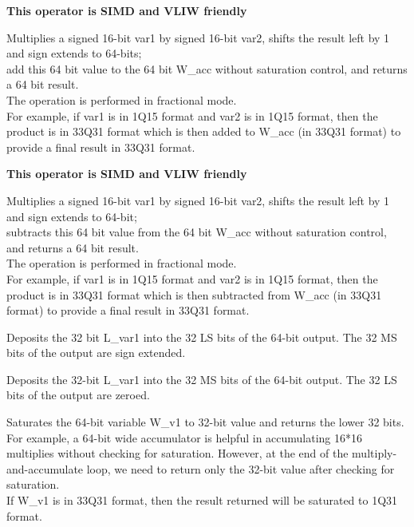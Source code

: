 
\textbf{ This operator is SIMD and VLIW friendly}

Multiplies a signed 16-bit var1 by signed 16-bit var2, shifts the result left by 1 and sign extends to 64-bits;\\
add this 64 bit value to the 64 bit W\_acc without saturation control, and returns a 64 bit result.\\
The operation is performed in fractional mode.\\
For example, if var1 is in 1Q15 format and var2 is in 1Q15 format, then the product is in 33Q31 format which is then added to W\_acc (in 33Q31 format) to provide a final result in 33Q31 format.


\textbf{ This operator is SIMD and VLIW friendly}

Multiplies a signed 16-bit var1 by signed 16-bit var2, shifts the result left by 1 and sign extends to 64-bit;\\
subtracts this 64 bit value from the 64 bit W\_acc without saturation control, and returns a 64 bit result.\\
The operation is performed in fractional mode.\\
For example, if var1 is in 1Q15 format and var2 is in 1Q15 format, then the product is in 33Q31 format which is then subtracted from W\_acc (in 33Q31 format) to provide a final result in 33Q31 format.


Deposits the 32 bit L\_var1 into the 32 LS bits of the 64-bit output. The 32 MS bits of the output are sign extended.


Deposits the 32-bit L\_var1 into the 32 MS bits of the 64-bit output. The 32 LS bits of the output are zeroed.


Saturates the 64-bit variable W\_v1 to 32-bit value and returns the lower 32 bits.\\
For example, a 64-bit wide accumulator is helpful in accumulating 16*16 multiplies without checking for saturation.
However, at the end of the multiply-and-accumulate loop, we need to return only the 32-bit value after checking for saturation.\\
If W\_v1 is in 33Q31 format, then the result returned will be saturated to 1Q31 format.

